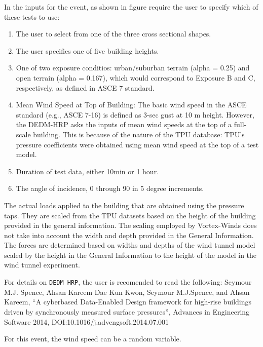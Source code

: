 In the inputs for the event, as shown in figure  require the user to specify which 
of these tests to use:
\begin{enumerate} 
\item The user to select from one of the three cross sectional shapes.
\item The user specifies one of five building heights.
\item One of two exposure conditios: urban/suburban terrain (alpha = 0.25)
and open terrain (alpha = 0.167), which would correspond to Exposure B and C, respectively, 
as defined in ASCE 7 standard.
\item Mean Wind Speed at Top of Building: The basic wind speed in the ASCE standard 
(e.g., ASCE 7-16) is defined as 3-sec gust at 10 m height. However, the DEDM-HRP asks
the inputs of mean wind speeds at the top of a full-scale building. This is because of 
the nature of the TPU database: TPU’s pressure coefficients were obtained using mean wind 
speed at the top of a test model.
\item Duration of test data, either 10min or 1 hour.
\item The angle of incidence, 0 through 90 in 5 degree increments.
\end{enumerate}

The actual loads applied to the building that are obtained using the pressure taps. They are scaled from the TPU datasets based on the height of the building provided in the general information. The scaling employed by Vortex-Winds does not take into account the width and depth provided in the General Information. The forces are determined based on widths and depths of the wind tunnel model scaled by the height in the General Information to the height of the model in the wind tunnel experiment.

For details on \texttt{DEDM HRP}, the user is recomended to read the following:
Seymour M.J. Spence, Ahsan Kareem
Dae Kun Kwon, Seymour M.J.Spence, and Ahsan Kareem, ``A cyberbased Data-Enabled Design framework for high-rise buildings driven by synchronously measured surface pressures'', Advances in Engineering Software 2014, DOI:10.1016/j.advengsoft.2014.07.001


For this event, the wind speed can be a random variable.

